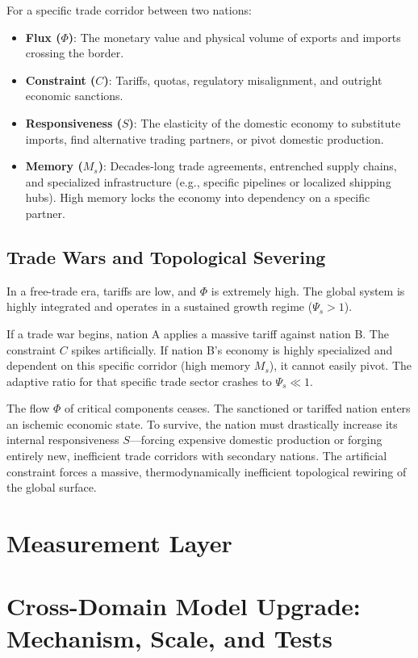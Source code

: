 \documentclass[11pt,a4paper]{article}
\begin{document}
For a specific trade corridor between two nations:
\begin{itemize}
    \item \textbf{Flux ($\Phi$)}: The monetary value and physical volume of exports and imports crossing the border.
    \item \textbf{Constraint ($C$)}: Tariffs, quotas, regulatory misalignment, and outright economic sanctions.
    \item \textbf{Responsiveness ($S$)}: The elasticity of the domestic economy to substitute imports, find alternative trading partners, or pivot domestic production.
    \item \textbf{Memory ($M_s$)}: Decades-long trade agreements, entrenched supply chains, and specialized infrastructure (e.g., specific pipelines or localized shipping hubs). High memory locks the economy into dependency on a specific partner.
\end{itemize}

\subsection{Trade Wars and Topological Severing}
In a free-trade era, tariffs are low, and $\Phi$ is extremely high. The global system is highly integrated and operates in a sustained growth regime ($\Psi_s > 1$).

If a trade war begins, nation A applies a massive tariff against nation B. The constraint $C$ spikes artificially. If nation B's economy is highly specialized and dependent on this specific corridor (high memory $M_s$), it cannot easily pivot. The adaptive ratio for that specific trade sector crashes to $\Psi_s \ll 1$.

The flow $\Phi$ of critical components ceases. The sanctioned or tariffed nation enters an ischemic economic state. To survive, the nation must drastically increase its internal responsiveness $S$---forcing expensive domestic production or forging entirely new, inefficient trade corridors with secondary nations. The artificial constraint forces a massive, thermodynamically inefficient topological rewiring of the global surface.



\section{Measurement Layer}

\section{Cross-Domain Model Upgrade: Mechanism, Scale, and Tests}
\end{document}
